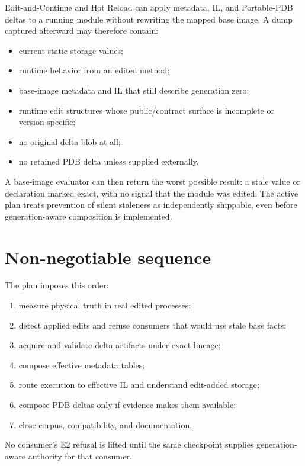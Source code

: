 \documentclass[11pt,oneside,openany]{book}
\begin{document}
Edit-and-Continue and Hot Reload can apply metadata, IL, and Portable-PDB deltas to a running module without rewriting the mapped base image. A dump captured afterward may therefore contain:

\begin{itemize}
  \item current static storage values;
  \item runtime behavior from an edited method;
  \item base-image metadata and IL that still describe generation zero;
  \item runtime edit structures whose public/contract surface is incomplete or version-specific;
  \item no original delta blob at all;
  \item no retained PDB delta unless supplied externally.
\end{itemize}

A base-image evaluator can then return the worst possible result: a stale value or declaration marked exact, with no signal that the module was edited. The active plan treats prevention of silent staleness as independently shippable, even before generation-aware composition is implemented.

\section{Non-negotiable sequence}

The plan imposes this order:

\begin{enumerate}
  \item measure physical truth in real edited processes;
  \item detect applied edits and refuse consumers that would use stale base facts;
  \item acquire and validate delta artifacts under exact lineage;
  \item compose effective metadata tables;
  \item route execution to effective IL and understand edit-added storage;
  \item compose PDB deltas only if evidence makes them available;
  \item close corpus, compatibility, and documentation.
\end{enumerate}

No consumer's E2 refusal is lifted until the same checkpoint supplies generation-aware authority for that consumer.
\end{document}
